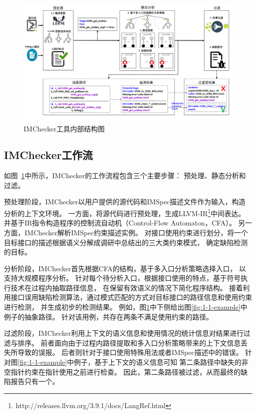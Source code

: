 \begin{figure}[b]
	\centering
	\includegraphics[width=\linewidth]{figures/cp3-3-overview.png}
	\caption{
		IMChecker工具内部结构图
	}
	\label{fig:3-3-overview}
\end{figure}

\subsection{IMChecker工作流}

如图~\ref{fig:3-3-overview}中所示，IMChecker的工作流程包含三个主要步骤：
预处理、静态分析和过滤。

预处理阶段，IMChecker以用户提供的源代码和IMSpec描述文件作为输入，构造分析的上下文环境。
一方面，将源代码进行预处理，生成LLVM-IR\footnote{http://releases.llvm.org/3.9.1/docs/LangRef.html}中间表达。
并基于IR指令构造程序的控制流自动机（Control-Flow Automaton，CFA）。
另一方面，IMChecker解析IMSpec约束描述实例。
对接口使用约束进行划分，将一个目标接口的描述根据语义分解成调研中总结出的三大类约束模式，
确定缺陷检测的目标。

分析阶段，IMChecker首先根据CFA的结构，基于多入口分析策略选择入口，
以支持大规模程序分析。
针对每个待分析入口，根据接口使用的特点，基于符号执行技术在过程内抽取路径信息，
在保留有效语义的情况下简化程序结构。
接着利用接口误用缺陷检测算法，通过模式匹配的方式对目标接口的路径信息和使用约束进行检测，
并生成初步的检测结果。
例如，图\ref{fig:3-3-overview}中下侧给出图\ref{fig:1-1-example}中例子的抽象路径。
针对该用例，共存在两条不满足使用约束的路径。

过滤阶段，IMChecker利用上下文的语义信息和使用情况的统计信息对结果进行过滤与排序。
前者面向由于过程内路径提取和多入口分析策略带来的上下文信息丢失所导致的误报。
后者则针对于接口使用特殊用法或者IMSpec描述中的错误。
针对图\ref{fig:1-1-example}中例子，基于上下文的语义信息可知
第二条路径中缺失的非空指针约束在指针使用之前进行检查。
因此，第二条路径被过滤，从而最终的缺陷报告只有一个。

